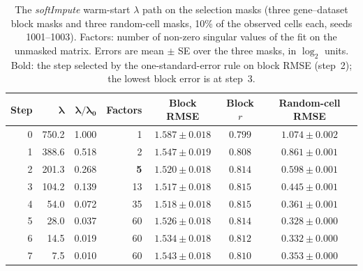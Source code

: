 \documentclass[11pt,a4paper]{article}
\begin{document}
\begin{table}[htbp]
\centering
\footnotesize
\begin{tabular}{@{}rrrrccc@{}}
\toprule
\textbf{Step} & $\boldsymbol{\lambda}$ & $\boldsymbol{\lambda/\lambda_0}$ & \textbf{Factors} & \textbf{Block RMSE} & \textbf{Block $r$} & \textbf{Random-cell RMSE} \\
\midrule
0 & 750.2 & 1.000 & 1 & $1.587 \pm 0.018$ & $0.799$ & $1.074 \pm 0.002$ \\
1 & 388.6 & 0.518 & 2 & $1.547 \pm 0.019$ & $0.808$ & $0.861 \pm 0.001$ \\
2 & 201.3 & 0.268 & \textbf{5} & $1.520 \pm 0.018$ & $0.814$ & $0.598 \pm 0.001$ \\
3 & 104.2 & 0.139 & 13 & $1.517 \pm 0.018$ & $0.815$ & $0.445 \pm 0.001$ \\
4 &  54.0 & 0.072 & 35 & $1.518 \pm 0.018$ & $0.815$ & $0.361 \pm 0.001$ \\
5 &  28.0 & 0.037 & 60 & $1.526 \pm 0.018$ & $0.814$ & $0.328 \pm 0.000$ \\
6 &  14.5 & 0.019 & 60 & $1.534 \pm 0.018$ & $0.812$ & $0.332 \pm 0.000$ \\
7 &   7.5 & 0.010 & 60 & $1.543 \pm 0.018$ & $0.810$ & $0.353 \pm 0.000$ \\
\bottomrule
\end{tabular}
\caption{The \textit{softImpute} warm-start $\lambda$ path on
  the selection masks (three gene--dataset block masks and three
  random-cell masks, 10\% of the observed cells each, seeds
  1001--1003). Factors: number of non-zero singular values of the
  fit on the unmasked matrix. Errors are mean $\pm$ SE over the
  three masks, in $\log_2$ units. Bold: the step selected by the
  one-standard-error rule on block RMSE (step~2); the lowest block
  error is at step~3.}
\label{tab:supp-lambda-path}
\end{table}
\end{document}
